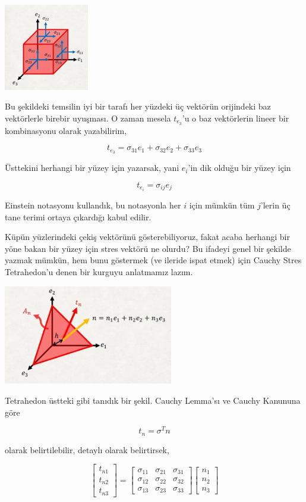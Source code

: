 \documentclass[12pt,fleqn]{article}\usepackage{../../common}
\begin{document}
\includegraphics[width=10em]{phy_020_strs_02_04.png}

Bu şekildeki temsilin iyi bir tarafı her yüzdeki üç vektörün orijindeki
baz vektörlerle birebir uyuşması. O zaman mesela $t_{e_3}$'u o baz vektörlerin
lineer bir kombinasyonu olarak yazabilirim,

$$
t_{e_3} = \sigma_{31} e_1 + \sigma_{32} e_2 + \sigma_{33} e_3
$$

Üsttekini herhangi bir yüzey için yazarsak, yani $e_i$'in dik olduğu bir yüzey
için

$$
t_{e_i} = \sigma_{ij} e_j
$$

Einstein notasyonu kullandık, bu notasyonla her $i$ için mümkün tüm $j$'lerin üç
tane terimi ortaya çıkardığı kabul edilir.

Küpün yüzlerindeki çekiş vektörünü gösterebiliyoruz, fakat acaba herhangi bir
yöne bakan bir yüzey için stres vektörü ne olurdu? Bu ifadeyi genel bir şekilde
yazmak mümkün, hem bunu göstermek (ve ileride ispat etmek) için Cauchy Stres
Tetrahedon'u denen bir kurguyu anlatmamız lazım.

\includegraphics[width=20em]{phy_020_strs_02_05.png}

Tetrahedon üstteki gibi tanıdık bir şekil. Cauchy Lemma'sı ve Cauchy Kanununa
göre

$$
t_n = \sigma^T n
$$

olarak belirtilebilir, detaylı olarak belirtirsek,

$$
\left[\begin{array}{ccc}
t_{n1} \\ t_{n2} \\ t_{n3} 
\end{array}\right] =
\left[\begin{array}{ccc}
\sigma_{11} & \sigma_{21} & \sigma_{31} \\
\sigma_{12} & \sigma_{22} & \sigma_{32} \\
\sigma_{13} & \sigma_{23} & \sigma_{33} 
\end{array}\right]
\left[\begin{array}{ccc}
n_1 \\ n_2 \\ n_3
\end{array}\right]
$$
\end{document}
